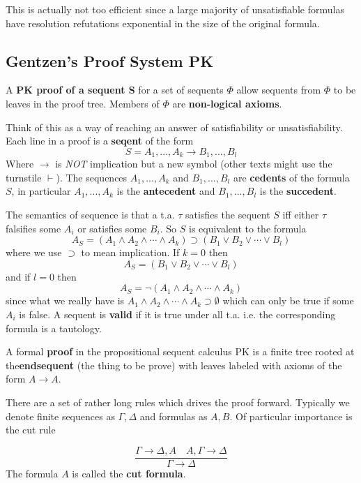 \documentclass[twoside]{article}
\begin{document}
This is actually not too efficient since a large majority of unsatisfiable formulas have resolution refutations exponential in the size of the original formula.  

\subsection{Gentzen's Proof System PK}
A \textbf{PK proof of a sequent S} for a set of sequents $\Phi$ allow sequents from $\Phi$ to be leaves in the proof tree. Members of $\Phi$ are \textbf{non-logical axioms}. 

Think of this as a way of reaching an answer of satisfiability or unsatisfiability. Each line in a proof is a \textbf{seqent} of the form
\[S = A_1, ..., A_k \rightarrow B_1, ..., B_l\]
Where $\rightarrow$ is \emph{NOT} implication but a new symbol (other texts might use the turnstile $\vdash$). The sequences $A_1, ..., A_k$ and $B_1, ..., B_l$ are \textbf{cedents} of the formula $S$, in particular $A_1, ..., A_k$ is the \textbf{antecedent} and $B_1, ..., B_l$ is the \textbf{succedent}.

The semantics of sequence is that a t.a. $\tau$ satisfies the sequent $S$ iff either $\tau$ falsifies some $A_i$ or satisfies some $B_i$. So $S$ is equivalent to the formula
\[A_S = (A_1 \land A_2 \land \cdots \land A_k) \supset (B_1 \lor B_2 \lor \cdots \lor B_l)\]
where we use $\supset$ to mean implication. If $k = 0$ then
\[A_S = (B_1 \lor B_2 \lor \cdots \lor B_l)\]
and if $l = 0$ then 
\[A_S = \lnot(A_1 \land A_2 \land \cdots \land A_k)\]    
since what we really have is $A_1 \land A_2 \land \cdots \land A_k \supset \emptyset$ which can only be true if some $A_i$ is false. A sequent is \textbf{valid} if it is true under all t.a. i.e. the corresponding formula is a tautology. 

A formal \textbf{proof} in the propositional sequent calculus PK is a finite tree rooted at the\textbf{endsequent} (the thing to be prove) with leaves labeled with axioms of the form $A \rightarrow A$.

There are a set of rather long rules which drives the proof forward. Typically we denote finite sequences as $\Gamma, \Delta$ and formulas as $A, B$. Of particular importance is the cut rule

\[\frac{\Gamma \rightarrow \Delta, A \quad A, \Gamma \rightarrow \Delta}{\Gamma \rightarrow \Delta}\]
The formula $A$ is called the \textbf{cut formula}. 
\end{document}
